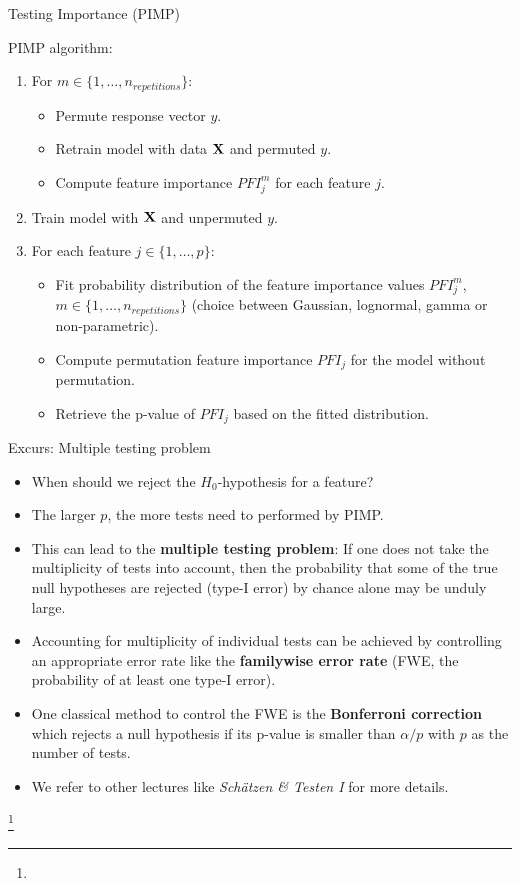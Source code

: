 \documentclass[11pt,compress,t,notes=noshow, xcolor=table]{beamer}
\begin{document}
\begin{vbframe}{Testing Importance (PIMP)}

PIMP algorithm:
\begin{enumerate}
	\item For $m \in \{1, \ldots, n_{repetitions}\}$:
		\begin{itemize}
			\item Permute response vector $y$.
			\item Retrain model with data $\Xmat$ and permuted $y$.
			\item Compute feature importance $PFI_j^m$ for each feature $j$.
		\end{itemize}
	\item Train model with $\Xmat$ and unpermuted $y$.
	\item For each feature $j \in \{1,\ldots,p\}$:
		\begin{itemize}
			\item Fit probability distribution of the feature importance values $PFI_j^m$, $m \in \{1, \ldots, n_{repetitions}\}$ (choice between Gaussian, lognormal, gamma or non-parametric).
			\item Compute permutation feature importance $PFI_j$ for the model without permutation.
			\item Retrieve the p-value of $PFI_j$ based on the fitted distribution.
		\end{itemize}
\end{enumerate}
\end{vbframe}

\begin{vbframe}{Excurs: Multiple testing problem}
\begin{itemize}
  \item When should we reject the $H_0$-hypothesis for a feature? 
  \item The larger $p$, the more tests need to performed by PIMP. 
  \item This can lead to the \textbf{multiple testing problem}: If one does not take the multiplicity of tests into account, then the probability that some of the true null hypotheses are rejected (type-I error) by chance alone may be unduly large.
  \item Accounting for multiplicity of individual tests can be achieved by controlling
  an appropriate error rate like the \textbf{familywise error rate} (FWE, the probability of at least one type-I error). 
  \item One classical method to control the FWE is the \textbf{Bonferroni correction} which rejects a null hypothesis if its p-value is smaller than $\alpha/p$ with $p$ as the number of tests. 
  \item We refer to other lectures like \textit{Schätzen \& Testen I} for more details.
  \end{itemize} 

  \footnote[frame]{}
\end{vbframe}
\end{document}
